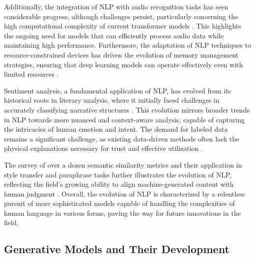 Additionally, the integration of NLP with audio recognition tasks has seen considerable progress, although challenges persist, particularly concerning the high computational complexity of current transformer models \cite{zhu2024deformableaudiotransformeraudio}. This highlights the ongoing need for models that can efficiently process audio data while maintaining high performance. Furthermore, the adaptation of NLP techniques to resource-constrained devices has driven the evolution of memory management strategies, ensuring that deep learning models can operate effectively even with limited resources \cite{zheng2024vmcucoordinatedmemorymanagement}.



Sentiment analysis, a fundamental application of NLP, has evolved from its historical roots in literary analysis, where it initially faced challenges in accurately classifying narrative structures \cite{jannidis2016analyzingfeaturesdetectionhappy}. This evolution mirrors broader trends in NLP towards more nuanced and context-aware analysis, capable of capturing the intricacies of human emotion and intent. The demand for labeled data remains a significant challenge, as existing data-driven methods often lack the physical explanations necessary for trust and effective utilization \cite{huang2022physicallyexplainablecnnsar}.



The survey of over a dozen semantic similarity metrics and their application in style transfer and paraphrase tasks further illustrates the evolution of NLP, reflecting the field's growing ability to align machine-generated content with human judgment \cite{yamshchikov2020styletransferparaphraselookingsensible}. Overall, the evolution of NLP is characterized by a relentless pursuit of more sophisticated models capable of handling the complexities of human language in various forms, paving the way for future innovations in the field.



\subsection{Generative Models and Their Development} \label{subsec:Generative Models and Their Development}



